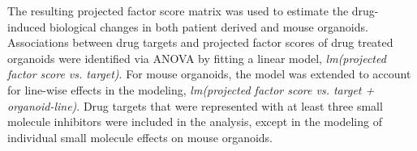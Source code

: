\begin{flushleft}
\smallbreak
The resulting projected factor score matrix was used to estimate the drug-induced biological changes in both patient derived and mouse organoids. Associations between drug targets and projected factor scores of drug treated organoids were identified via ANOVA by fitting a linear model, \textit{lm(projected factor score vs. target)}. For mouse organoids, the model was extended to account for line-wise effects in the modeling, \textit{lm(projected factor score vs. target + organoid-line)}. Drug targets that were represented with at least three small molecule inhibitors were included in the analysis, except in the modeling of individual small molecule effects on mouse organoids.

\end{flushleft}